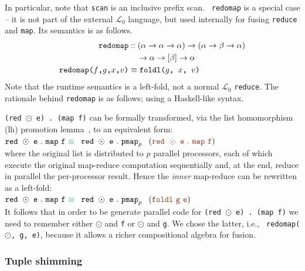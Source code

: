 \documentclass{sigplanconf}  %
\newcommand{\emp}[1]{\textcolor{DikuRed}{ #1}}
\newcommand{\emphh}[1]{\textcolor{CosGreen}{ #1}}
\newcommand{\LO}{$\mathcal{L}_0$}
\begin{document}
In particular, note that {\tt scan} is an inclusive prefix scan.  {\tt
  redomap} is a special case -- it is not part of the external \LO{}
language, but used internally for fusing {\tt reduce} and {\tt map}.
Its semantics is as follows.
\begin{align*}
\text{\tt redomap}
& :: (\alpha\rightarrow\alpha\rightarrow\alpha)\rightarrow(\alpha\rightarrow\beta\rightarrow\alpha)\\
& \quad\rightarrow\alpha\rightarrow[\beta]\rightarrow\alpha \\
\text{\tt redomap($f$,$g$,$x$,$v$)} & \equiv \text{\tt foldl($g$, $x$, $v$)}
\end{align*}
Note that the runtime semantics is a left-fold, not a normal \LO{}
\texttt{reduce}.  The rationale behind {\tt redomap} is as follows;
using a Haskell-like syntax.

{\tt (red $\odot$ e) . (map f)} can be formally transformed, via the
list homomorphism ({\sc lh}) promotion lemma~\cite{BirdListTh}, to an
equivalent form:  \\
${\tt red}\mbox{ }\odot\mbox{ }{\tt e}\mbox{ }.\mbox{ }{\tt map}\mbox{
}{\tt f}\mbox{ }\emphh{\equiv}$ $\mbox{ }{\tt red}\mbox{ }\odot\mbox{
}{\tt e}\mbox{ }.\mbox{ }{\tt pmap}_{p} \mbox{ }$ $(\emp{{\tt red} \mbox{
  }\odot\mbox{ }{\tt e}\mbox{ }.\mbox{ }{\tt map}\mbox{ }{\tt f}})$\\
where the original list is distributed to $p$ parallel processors,
each of which execute the original map-reduce computation sequentially
and, at the end, reduce in parallel the per-processor result.  Hence
the {\em inner} map-reduce can be
rewritten as a left-fold:\\
${\tt red}\mbox{ }\odot\mbox{ }{\tt e}\mbox{ }.\mbox{ }{\tt map}\mbox{
}{\tt f}\mbox{ }\emphh{\equiv}$ $\mbox{ }{\tt red}\mbox{ }\odot\mbox{
}{\tt e}\mbox{ }.\mbox{ }{\tt pmap}_{p} \mbox{ }$ $(\emp{{\tt foldl}\mbox{
  }{\tt g}\mbox{ }{\tt e}})$\\
It follows that in order to be generate parallel code for {\tt (red
  $\odot$ e) . (map f)} we need to remember either $\odot$ and {\tt f}
or $\odot$ and {\tt g}. We chose the latter, i.e., {\tt
  redomap($\odot$, g, e)}, because it allows a richer compositional
algebra for fusion.

\subsubsection{Tuple shimming}
\label{sec:shimming}
\end{document}
